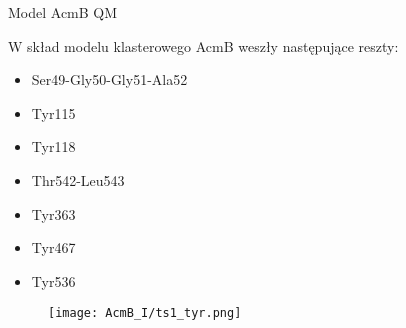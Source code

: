 \documentclass[10pt,a4paper]{article}
\begin{document}











\begin{section}{Model AcmB QM}

W skład modelu klasterowego AcmB weszły następujące reszty:
\begin{itemize}
 \item Ser49-Gly50-Gly51-Ala52
 \item Tyr115
 \item Tyr118
 \item Thr542-Leu543
 \item Tyr363
 \item Tyr467
 \item Tyr536
\end{itemize}

 \begin{figure}[H]
  \texttt{[image: AcmB\_I/ts1\_tyr.png]}
\end{figure}
 
\end{section}
\end{document}
